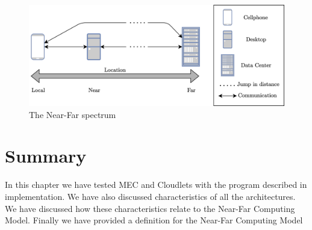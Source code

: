 \begin{figure}[t]
    \centering
    \includegraphics[scale=1]{chapters/evaluation/figures/near-far-diagram.png}
    \caption{The Near-Far spectrum}
    \label{fig:nearFarSimple}
\end{figure}



\section{Summary}
In this chapter we have tested MEC and Cloudlets with the program described in implementation. We have also discussed characteristics of all the architectures. We have discussed how these characteristics relate to the Near-Far Computing Model. Finally we have provided a definition for the Near-Far Computing Model





